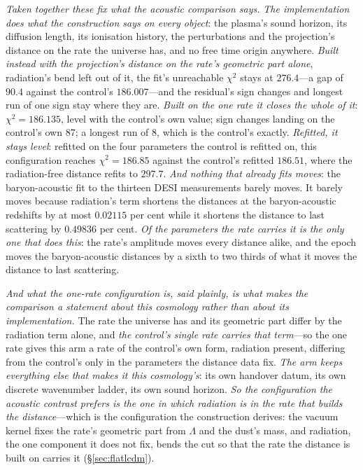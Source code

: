 \documentclass[11pt,a4paper]{article}
\theoremstyle{plain}
\theoremstyle{definition}
\theoremstyle{remark}
\begin{document}
\emph{Taken together these fix what the acoustic comparison says.} \emph{The implementation does what the
construction says on every object}: the plasma's sound horizon, its diffusion length, its ionisation history,
the perturbations and the projection's distance on the rate the universe has, and no free time origin
anywhere. \emph{Built instead with the projection's distance on the rate's geometric part alone}, radiation's
bend left out of it, the fit's unreachable $\chi^{2}$ stays at $276.4$---a gap of $90.4$ against the control's
$186.007$---and the residual's sign changes and longest run of one sign stay where they are. \emph{Built on
the one rate it closes the whole of it}: $\chi^{2}=186.135$, level with the control's own value; sign changes
landing on the control's own $87$; a longest run of $8$, which is the control's exactly.
\emph{Refitted, it stays level}: refitted on the four parameters the control is refitted on, this configuration reaches $\chi^{2}=186.85$ against the control's refitted $186.51$, where the radiation-free distance refits to $297.7$. \emph{And nothing that already fits moves}: the baryon-acoustic fit to the thirteen DESI measurements barely moves. It barely moves because radiation's term shortens the distances at the baryon-acoustic redshifts by at most $0.02115$ per cent while it shortens the distance to last scattering by $0.49836$ per cent. \emph{Of the parameters the rate carries it is the only one that does this}: the rate's amplitude moves every distance alike, and the epoch moves the baryon-acoustic distances by a sixth to two thirds of what it moves the distance to last scattering.

\emph{And what the one-rate configuration is, said plainly, is what makes the comparison a statement about
this cosmology rather than about its implementation.} The rate the universe has and its geometric part differ
by the radiation term alone, and \emph{the control's single rate carries that term}---so the one rate gives
this arm a rate of the control's own form, radiation present, differing from the control's only in the
parameters the distance data fix. \emph{The arm keeps everything else that makes it this cosmology's}: its own
handover datum, its own discrete wavenumber ladder, its own sound horizon. \emph{So the configuration the
acoustic contrast prefers is the one in which radiation is in the rate that builds the distance}---which is the
configuration the construction derives: the vacuum kernel fixes the rate's geometric part from $\Lambda$ and the
dust's mass, and radiation, the one component it does not fix, bends the cut so that the rate the distance is
built on carries it (\S\ref{sec:flatlcdm}).
\end{document}
